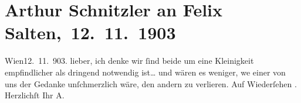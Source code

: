 

         
         \renewcommand{\erwaehntePersonen}{Personen: Felix Salten}
         \renewcommand{\erwaehnteOrte}{Orte: Wien}
         \renewcommand{\erwaehnteWerke}{}
               \section[ Arthur Schnitzler an Felix Salten, 12. 11. 1903]{ Arthur Schnitzler an Felix Salten, 12. 11. 1903}\nopagebreak{}\rehead{ }\begin{ledgroupsized}[t]{13cm}\normalsize\beginnumbering{} \toendnotes[C]{\smallbreak\pagebreak[2]} 
\toendnotes[C]{\smallbreak}\pstart
           \raggedleft{}{\pb}Wien12. 11. 903.\pend
           \pstart
           lieber, ich denke wir ſind beide um eine Kleinigkeit empfindlicher
               als dringend notwendig ist{\dots} und wären es weniger, we{\geminationn} einer von uns der Gedanke unſchmerzlich wäre, den
               andern zu verlieren. Auf Wiederſehen \label{K_L02990-1v}\label{K_L02990-1h}. Herzlichſt Ihr\pend
           \pstart \spacefill\mbox{A.}\pend{}
         
         \endnumbering{}\end{ledgroupsized}  \newcommand{\dateiname}{L02990}\newcommand{\titel}{Arthur Schnitzler an Felix Salten, 12. 11. 1903}\newcommand{\editorInnen}{Martin Anton Müller und Laura Untner}
      